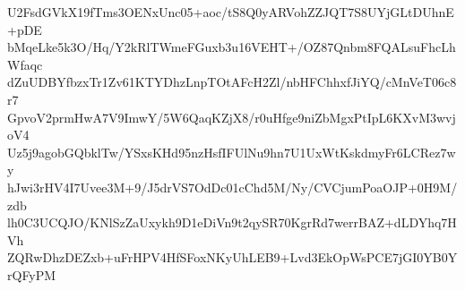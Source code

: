 U2FsdGVkX19fTms3OENxUnc05+aoc/tS8Q0yARVohZZJQT7S8UYjGLtDUhnE+pDE
bMqeLke5k3O/Hq/Y2kRlTWmeFGuxb3u16VEHT+/OZ87Qnbm8FQALsuFhcLhWfaqc
dZuUDBYfbzxTr1Zv61KTYDhzLnpTOtAFcH2Zl/nbHFChhxfJiYQ/cMnVeT06c8r7
GpvoV2prmHwA7V9ImwY/5W6QaqKZjX8/r0uHfge9niZbMgxPtIpL6KXvM3wvjoV4
Uz5j9agobGQbklTw/YSxsKHd95nzHsfIFUlNu9hn7U1UxWtKskdmyFr6LCRez7wy
hJwi3rHV4I7Uvee3M+9/J5drVS7OdDc01cChd5M/Ny/CVCjumPoaOJP+0H9M/zdb
lh0C3UCQJO/KNlSzZaUxykh9D1eDiVn9t2qySR70KgrRd7werrBAZ+dLDYhq7HVh
ZQRwDhzDEZxb+uFrHPV4HfSFoxNKyUhLEB9+Lvd3EkOpWsPCE7jGI0YB0YrQFyPM

